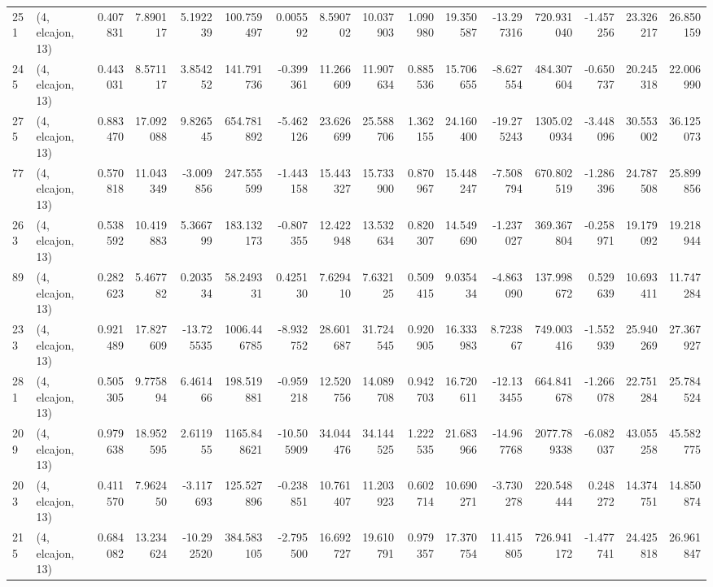 \begin{tabular}{llrrrrrrrrrrrrrr}
251 &  (4, elcajon, 13) &   0.407831 &   7.890117 &   5.192239 &   100.759497 &   0.005592 &   8.590702 &  10.037903 &  1.090980 &  19.350587 & -13.297316 &   720.931040 &  -1.457256 &  23.326217 &  26.850159 \\
245 &  (4, elcajon, 13) &   0.443031 &   8.571117 &   3.854252 &   141.791736 &  -0.399361 &  11.266609 &  11.907634 &  0.885536 &  15.706655 &  -8.627554 &   484.307604 &  -0.650737 &  20.245318 &  22.006990 \\
275 &  (4, elcajon, 13) &   0.883470 &  17.092088 &   9.826545 &   654.781892 &  -5.462126 &  23.626699 &  25.588706 &  1.362155 &  24.160400 & -19.275243 &  1305.020934 &  -3.448096 &  30.553002 &  36.125073 \\
77  &  (4, elcajon, 13) &   0.570818 &  11.043349 &  -3.009856 &   247.555599 &  -1.443158 &  15.443327 &  15.733900 &  0.870967 &  15.448247 &  -7.508794 &   670.802519 &  -1.286396 &  24.787508 &  25.899856 \\
263 &  (4, elcajon, 13) &   0.538592 &  10.419883 &   5.366799 &   183.132173 &  -0.807355 &  12.422948 &  13.532634 &  0.820307 &  14.549690 &  -1.237027 &   369.367804 &  -0.258971 &  19.179092 &  19.218944 \\
89  &  (4, elcajon, 13) &   0.282623 &   5.467782 &   0.203534 &    58.249331 &   0.425130 &   7.629410 &   7.632125 &  0.509415 &   9.035434 &  -4.863090 &   137.998672 &   0.529639 &  10.693411 &  11.747284 \\
233 &  (4, elcajon, 13) &   0.921489 &  17.827609 & -13.725535 &  1006.446785 &  -8.932752 &  28.601687 &  31.724545 &  0.920905 &  16.333983 &   8.723867 &   749.003416 &  -1.552939 &  25.940269 &  27.367927 \\
281 &  (4, elcajon, 13) &   0.505305 &   9.775894 &   6.461466 &   198.519881 &  -0.959218 &  12.520756 &  14.089708 &  0.942703 &  16.720611 & -12.133455 &   664.841678 &  -1.266078 &  22.751284 &  25.784524 \\
209 &  (4, elcajon, 13) &   0.979638 &  18.952595 &   2.611955 &  1165.848621 & -10.505909 &  34.044476 &  34.144525 &  1.222535 &  21.683966 & -14.967768 &  2077.789338 &  -6.082037 &  43.055258 &  45.582775 \\
203 &  (4, elcajon, 13) &   0.411570 &   7.962450 &  -3.117693 &   125.527896 &  -0.238851 &  10.761407 &  11.203923 &  0.602714 &  10.690271 &  -3.730278 &   220.548444 &   0.248272 &  14.374751 &  14.850874 \\
215 &  (4, elcajon, 13) &   0.684082 &  13.234624 & -10.292520 &   384.583105 &  -2.795500 &  16.692727 &  19.610791 &  0.979357 &  17.370754 &  11.415805 &   726.941172 &  -1.477741 &  24.425818 &  26.961847 \\

\end{tabular}
